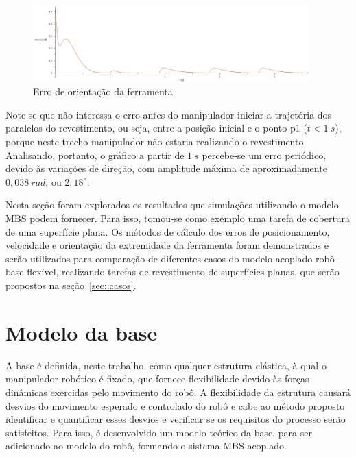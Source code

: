 \begin{figure}[h]
	\centering 
 	\includegraphics[width=0.95\textwidth]{figs/orierro_exemplo}
 	\caption{Erro de orientação da ferramenta}
 	\label{fig::orierro_exemplo}
\end{figure}

Note-se que não interessa o erro antes do manipulador iniciar a trajetória dos
paralelos do revestimento, ou seja, entre a posição inicial e o ponto p1
($t<1~s$), porque neste trecho manipulador não estaria realizando o
revestimento.
Analisando, portanto, o gráfico a partir de $1~s$ percebe-se um erro periódico,
devido às variações de direção, com amplitude máxima de aproximadamente
$0,038~rad$, ou $2,18^{\circ}$.



Nesta seção foram explorados os resultados que simulações utilizando o modelo
MBS podem fornecer. Para isso, tomou-se como exemplo uma tarefa de cobertura de
uma superfície plana. Os métodos de cálculo dos erros de posicionamento,
velocidade e orientação da extremidade da ferramenta foram demonstrados e serão
utilizados para comparação de diferentes casos do modelo acoplado robô-base
flexível, realizando tarefas de revestimento de superfícies planas, que serão
propostos na seção~\ref{sec::casos}.



\section{Modelo da base} \label{sec::base}

A base é definida, neste trabalho, como qualquer estrutura elástica, à qual o
manipulador robótico é fixado, que fornece flexibilidade devido às forças
dinâmicas exercidas pelo movimento do robô. A flexibilidade da estrutura causará
desvios do movimento esperado e controlado do robô e cabe ao método proposto
identificar e quantificar esses desvios e verificar se os requisitos do processo
serão satisfeitos. Para isso, é desenvolvido um modelo teórico da base, para ser
adicionado ao modelo do robô, formando o sistema MBS acoplado.

